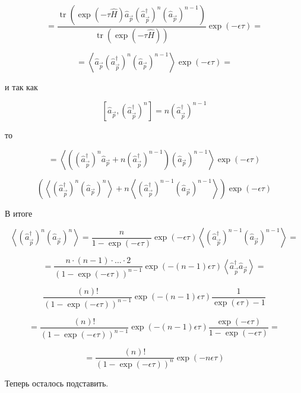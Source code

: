 \documentclass[a4paper,12pt]{article} %
\begin{document}
\begin{ttask}
$$
=\frac{\operatorname{tr}\left(\exp (-\tau \hat{H}) \hat{a}_{\vec{p}}\left(\hat{a}_{\vec{p}}^{\dagger}\right)^{n}\left(\hat{a}_{\vec{p}}\right)^{n-1}\right)}{\operatorname{tr}(\exp (-\tau \hat{H}))} \exp (-\epsilon \tau)=
$$


$$
=\left\langle\hat{a}_{\vec{p}}\left(\hat{a}_{\vec{p}}^{\dagger}\right)^{n}\left(\hat{a}_{\vec{p}}\right)^{n-1}\right\rangle \exp (-\epsilon \tau)=
$$



и так как


$$
\left[\hat{a}_{\vec{p}},\left(\hat{a}_{\vec{p}}^{\dagger}\right)^{n}\right]=n\left(\hat{a}_{\vec{p}}^{\dagger}\right)^{n-1}
$$


то


$$
=\left\langle\left(\left(\hat{a}_{\vec{p}}^{\dagger}\right)^{n} \hat{a}_{\vec{p}}+n\left(\hat{a}_{\vec{p}}^{\dagger}\right)^{n-1}\right)\left(\hat{a}_{\vec{p}}\right)^{n-1}\right\rangle \exp (-\epsilon \tau)
$$


$$
\left(\left\langle\left(\hat{a}_{\vec{p}}^{\dagger}\right)^{n}\left(\hat{a}_{\vec{p}}\right)^{n}\right\rangle+n\left\langle\left(\hat{a}_{\vec{p}}^{\dagger}\right)^{n-1}\left(\hat{a}_{\vec{p}}\right)^{n-1}\right\rangle\right) \exp (-\epsilon \tau)
$$



В итоге



$$
\left\langle\left(\hat{a}_{\vec{p}}^{\dagger}\right)^{n}\left(\hat{a}_{\vec{p}}\right)^{n}\right\rangle=\frac{n}{1-\exp (-\epsilon \tau)} \exp (-\epsilon \tau)\left\langle\left(\hat{a}_{\vec{p}}^{\dagger}\right)^{n-1}\left(\hat{a}_{\vec{p}}\right)^{n-1}\right\rangle=
$$



$$
=\frac{n \cdot(n-1) \cdot \ldots \cdot 2}{(1-\exp (-\epsilon \tau))^{n-1}} \exp (-(n-1) \epsilon \tau)\left\langle\hat{a}_{\vec{p}}^{\dagger} \hat{a}_{\vec{p}}\right\rangle=
$$


$$
\frac{(n) !}{(1-\exp (-\epsilon \tau))^{n-1}} \exp (-(n-1) \epsilon \tau) \frac{1}{\exp (\epsilon \tau)-1}
$$


$$
=\frac{(n) !}{(1-\exp (-\epsilon \tau))^{n-1}} \exp (-(n-1) \epsilon \tau) \frac{\exp (-\epsilon \tau)}{1-\exp (-\epsilon \tau)}=
$$


$$
=\frac{(n) !}{(1-\exp (-\epsilon \tau))^{n}} \exp (-n \epsilon \tau)
$$

Теперь осталось подставить.







\end{ttask}
\end{document}
